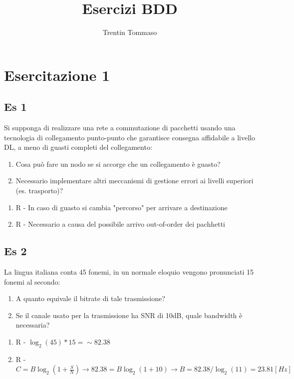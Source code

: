 \documentclass{article}
\title{Esercizi BDD}
\author{Trentin Tommaso}
\begin{document}
  \section{Esercitazione 1}
    \subsection{Es 1}
      Si supponga di realizzare una rete a commutazione di pacchetti usando una tecnologia di collegamento punto-punto che garantisce consegna affidabile a livello DL, a meno di guasti completi del collegamento:
      \begin{enumerate}
        \item Cosa può fare un nodo se si accorge che un collegamento è guasto?
        \item Necessario implementare altri meccanismi di gestione errori ai livelli superiori (es. trasporto)?
      \end{enumerate}
      \begin{enumerate}
        \item R - In caso di guasto si cambia "percorso" per arrivare a destinazione
        \item R - Necessario a causa del possibile arrivo out-of-order dei pachhetti
      \end{enumerate}
    \subsection{Es 2}
      La lingua italiana conta 45 fonemi, in un normale eloquio vengono pronunciati 15 fonemi al secondo:
      \begin{enumerate}
        \item A quanto equivale il bitrate di tale trasmissione?
        \item Se il canale usato per la trasmissione ha SNR di 10dB, quale bandwidth è necessaria?
      \end{enumerate}
      \begin{enumerate}
        \item R - $\log_2(45)*15=\sim82.38$
        \item R - $C=B\log_2(1+\frac{S}{N}) \rightarrow 82.38=B\log_2(1+10) \rightarrow B=82.38/\log_2(11)=23.81 [Hz]$  
      \end{enumerate}
\end{document}
